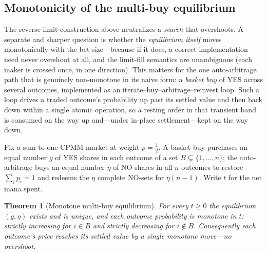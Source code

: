 \documentclass[11pt]{article}
\newtheorem{theorem}{Theorem}[section]
\begin{document}
\subsection{Monotonicity of the multi-buy equilibrium}
\label{sec:monotonicity}

The reverse-limit construction above neutralizes a \emph{search} that overshoots. A separate and sharper question is whether the \emph{equilibrium itself} moves monotonically with the bet size---because if it does, a correct implementation need never overshoot at all, and the limit-fill semantics are unambiguous (each maker is crossed once, in one direction). This matters for the one auto-arbitrage path that is genuinely non-monotone in its naive form: a \emph{basket buy} of YES across several outcomes, implemented as an iterate--buy--arbitrage--reinvest loop. Such a loop drives a traded outcome's probability up past its settled value and then back down within a single atomic operation, so a resting order in that transient band is consumed on the way up and---under in-place settlement---kept on the way down.

Fix a sum-to-one CPMM market at weight $p = \tfrac12$. A basket buy purchases an equal number $g$ of YES shares in each outcome of a set $B \subsetneq \{1,\dots,n\}$; the auto-arbitrage buys an equal number $\eta$ of NO shares in all $n$ outcomes to restore $\sum_i p_i = 1$ and redeems the $\eta$ complete NO-sets for $\eta(n-1)$. Write $t$ for the net mana spent.

\begin{theorem}[Monotone multi-buy equilibrium]
\label{thm:monotone}
For every $t \ge 0$ the equilibrium $(g,\eta)$ exists and is unique, and each outcome probability is monotone in $t$: strictly increasing for $i \in B$ and strictly decreasing for $i \notin B$. Consequently each outcome's price reaches its settled value by a single monotone move---no overshoot.
\end{theorem}
\end{document}
